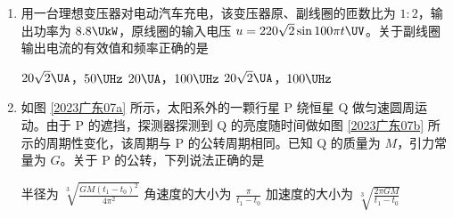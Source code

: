 \documentclass[\gkver]{gaokaozhenti}
\begin{document}
\begin{enumerate}
{$1.2\times10^{7} \Ums$}
{$5.4\times10^{7} \Ums$}
{$2.4\times10^{8} \Ums$}


\item
用一台理想变压器对电动汽车充电，该变压器原、副线圈的匝数比为 $1:2$，输出功率为 $8.8 \UkW$，原线圈的输入电压 $u = 220\sqrt{2}\sin 100\pi t \UV$。关于副线圈输出电流的有效值和频率正确的是

{$20\sqrt{2} \UA$，$50 \UHz$}
{$20 \UA$，$100 \UHz$}
{$20\sqrt{2} \UA$，$100 \UHz$}


\item
如图 \ref{2023广东07a} 所示，太阳系外的一颗行星 P 绕恒星 Q 做匀速圆周运动。由于 P 的遮挡，探测器探测到 Q 的亮度随时间做如图 \ref{2023广东07b} 所示的周期性变化，该周期与 P 的公转周期相同。已知 Q 的质量为 $M$，引力常量为 $G$。关于 P 的公转，下列说法正确的是


{半径为 $\sqrt[3]{\frac{GM(t_{1} - t_{0})^{2}}{4\pi^{2}}}$}
{角速度的大小为 $\frac{\pi}{t_{1} - t_{0}}$}
{加速度的大小为 $\sqrt[3]{\frac{2\pi GM}{t_{1} - t_{0}}}$}


\end{enumerate}
\end{document}
